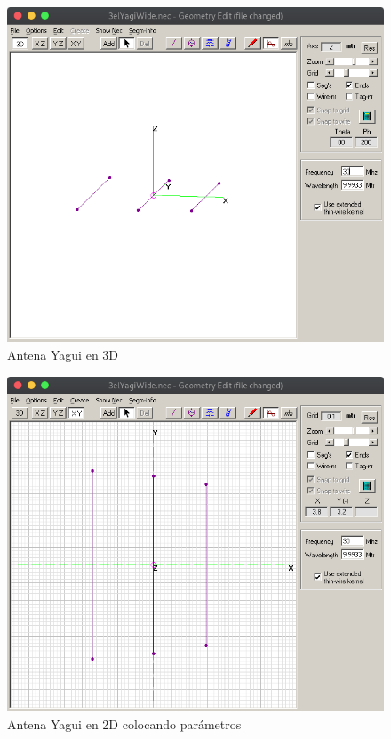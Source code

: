 \documentclass[11pt,a4paper]{article}
\begin{document}
\begin{figure}[H]
    \centering
    \includegraphics[scale=0.35]{images/Ejemplos/yagi.png}
    \caption{Antena Yagui en 3D}
    \label{fig3:yagui3d}
\end{figure}


\begin{figure}[H]
    \centering
    \includegraphics[scale=0.35]{images/Ejemplos/yagi1.png}
    \caption{Antena Yagui en 2D colocando par\'ametros}
    \label{fig3:yagui2d}
\end{figure}
\end{document}
